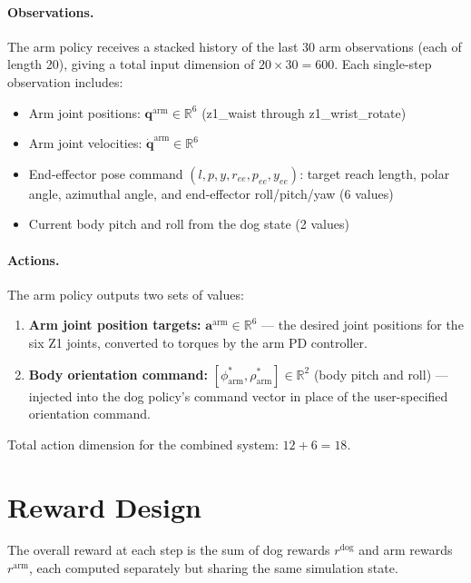 \paragraph{Observations.}
The arm policy receives a stacked history of the last 30 arm observations
(each of length 20), giving a total input dimension of $20 \times 30 = 600$.
Each single-step observation includes:
\begin{itemize}
  \item Arm joint positions: $\mathbf{q}^{\text{arm}} \in \mathbb{R}^{6}$
        (z1\_waist through z1\_wrist\_rotate)
  \item Arm joint velocities: $\dot{\mathbf{q}}^{\text{arm}} \in \mathbb{R}^{6}$
  \item End-effector pose command $(l, p, y, r_{ee}, p_{ee}, y_{ee})$:
        target reach length, polar angle, azimuthal angle, and end-effector
        roll/pitch/yaw (6 values)
  \item Current body pitch and roll from the dog state (2 values)
\end{itemize}

\paragraph{Actions.}
The arm policy outputs two sets of values:
\begin{enumerate}
  \item \textbf{Arm joint position targets:}
        $\mathbf{a}^{\text{arm}} \in \mathbb{R}^{6}$ --- the desired joint
        positions for the six Z1 joints, converted to torques by the arm PD
        controller.
  \item \textbf{Body orientation command:}
        $[{\phi}^*_{\text{arm}}, {\rho}^*_{\text{arm}}] \in \mathbb{R}^{2}$
        (body pitch and roll) --- injected into the dog policy's command
        vector in place of the user-specified orientation command.
\end{enumerate}

Total action dimension for the combined system: $12 + 6 = 18$.

\section{Reward Design}
\label{sec:rewards}

The overall reward at each step is the sum of dog rewards $r^{\text{dog}}$
and arm rewards $r^{\text{arm}}$, each computed separately but sharing
the same simulation state.

